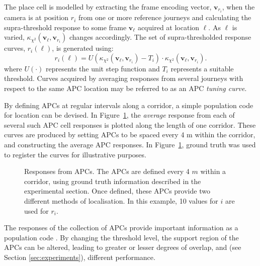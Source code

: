  The place cell is modelled by extracting the frame encoding vector, $\mathbf{v}_{r_i}$, when the camera is at position $r_i$ from one or more reference journeys and calculating the supra-threshold response to some frame $\mathbf{v}_{\ell}$ acquired at location $\ell$. As $\ell$ is varied, $\kappa_{\chi^2}(\mathbf{v}_{\ell},\mathbf{v}_{r_i})$ changes accordingly.  The set of supra-thresholded response curves, $r_i(\ell)$, is generated using:
\begin{equation}
r_i(\ell) = U(\kappa_{\chi^2}(\mathbf{v}_{\ell},\mathbf{v}_{r_i}) - T_i)\cdot \kappa_{\chi^2}(\mathbf{v}_{\ell},\mathbf{v}_{r_i}).
\end{equation}
where $U(\cdot)$ represents the unit step function and $T_i$ represents a suitable threshold. Curves acquired by averaging responses from several journeys with respect to the same APC location may be referred to as an APC {\em tuning curve}.

By defining APCs at regular intervals along a corridor, a simple population code for location can be devised. In Figure~\ref{fig:APCMany}, the {\em average} response from each of several such APC cell responses is plotted along the length of one corridor.  These curves are produced by setting APCs to be spaced every 4 m within the corridor, and constructing the average APC responses.  In Figure~\ref{fig:APCMany}, ground truth was used to register the curves for illustrative purposes.

\begin{figure}
\centering
  \setlength{}
  \setlength{}
  
\caption{Responses from APCs.  The APCs are defined every 4 $m$ within a corridor, using ground truth information described in the experimental section.  Once defined, these APCs provide two different methods of localisation. In this example, 10 values for $i$ are used for $r_i$.}
\label{fig:APCMany}
\end{figure}

The responses of the collection of APCs provide important information as a population code \cite{pouget2000information}.  By changing the threshold level, the support region of the APCs can be altered, leading to greater or lesser degrees of overlap, and (see Section \ref{sec:experiments}), different performance.


